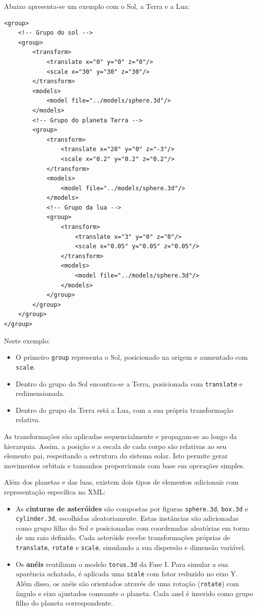 \documentclass[12pt, a4paper]{article}
\begin{document}
Abaixo apresenta-se um exemplo com o Sol, a Terra e a Lua:

\begin{lstlisting}
<group>
    <!-- Grupo do sol -->
    <group>
        <transform>
            <translate x="0" y="0" z="0"/>
            <scale x="30" y="30" z="30"/>
        </transform>
        <models>
            <model file="../models/sphere.3d"/>
        </models>
        <!-- Grupo do planeta Terra -->
        <group>
            <transform>
                <translate x="28" y="0" z="-3"/>
                <scale x="0.2" y="0.2" z="0.2"/>
            </transform>
            <models>
                <model file="../models/sphere.3d"/>
            </models>
            <!-- Grupo da lua -->
            <group>
                <transform>
                    <translate x="3" y="0" z="0"/>
                    <scale x="0.05" y="0.05" z="0.05"/>
                </transform>
                <models>
                    <model file="../models/sphere.3d"/>
                </models>
            </group>
        </group>
    </group>
</group>
\end{lstlisting}

Neste exemplo:
\begin{itemize}
    \item O primeiro \texttt{group} representa o Sol, posicionado na origem e aumentado com
    \texttt{scale}.
    \item Dentro do grupo do Sol encontra-se a Terra, posicionada com \texttt{translate} e
    redimensionada.
    \item Dentro do grupo da Terra está a Lua, com a sua própria transformação relativa.
\end{itemize}

As transformações são aplicadas sequencialmente e propagam-se ao longo da hierarquia. Assim, a
posição e a escala de cada corpo são relativas ao seu elemento pai, respeitando a estrutura do
sistema solar. Isto permite gerar movimentos orbitais e tamanhos proporcionais com base em
operações simples.

Além dos planetas e das luas, existem dois tipos de elementos adicionais com representação
específica no XML:

\begin{itemize}
    \item As \textbf{cinturas de asteróides} são compostas por figuras \texttt{sphere.3d},
    \texttt{box.3d} e \texttt{cylinder.3d}, escolhidas aleatoriamente. Estas instâncias são
    adicionadas como grupo filho do Sol e posicionadas com coordenadas aleatórias em torno de um
    raio definido. Cada asteróide recebe transformações próprias de \texttt{translate},
    \texttt{rotate} e \texttt{scale}, simulando a sua dispersão e dimensão variável.

    \item Os \textbf{anéis} reutilizam o modelo \texttt{torus.3d} da Fase I. Para
    simular a sua aparência achatada, é aplicada uma \texttt{scale} com fator reduzido no eixo
Y.
    Além disso, os anéis são orientados através de uma rotação (\texttt{rotate}) com
ângulo e
    eixo ajustados consoante o planeta. Cada anel é inserido como grupo filho do planeta
    correspondente.
\end{itemize}
\end{document}
